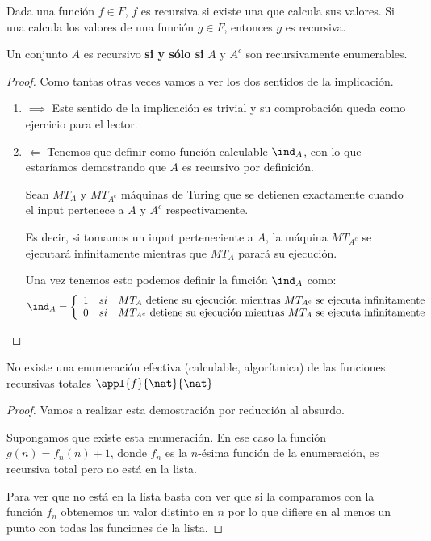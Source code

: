 \begin{theorem}
Dada una función $f\in F$, $f$ es recursiva si existe una \MT que calcula sus valores. Si una \MT calcula los valores de una función $g \in F$, entonces $g$ es recursiva.
\end{theorem}

\begin{theorem}
Un conjunto $A$ es recursivo \textbf{si y sólo si} $A$ y $A^c$ son recursivamente enumerables.
\end{theorem}
\begin{proof}
Como tantas otras veces vamos a ver los dos sentidos de la implicación.
\begin{enumerate}
\item $\implies$
Este sentido de la implicación es trivial y su comprobación queda como ejercicio para el lector.

\item $\Longleftarrow$
Tenemos que definir como función calculable $\ind_A$, con lo que estaríamos demostrando que $A$ es recursivo por definición.

Sean $MT_A$ y $MT_{A^c}$ máquinas de Turing que se detienen exactamente cuando el input pertenece a $A$ y $A^c$ respectivamente.

Es decir, si tomamos un input perteneciente a $A$, la máquina $MT_{A^c}$ se ejecutará infinitamente mientras que $MT_{A}$ parará su ejecución.

Una vez tenemos esto podemos definir la función $\ind_A$ como:
\[\ind_A = \left\{ \begin{array}{lll}
1 & si & MT_A \text{ detiene su ejecución mientras } MT_{A^c} \text{ se ejecuta infinitamente}\\
0 & si & MT_{A^c} \text{ detiene su ejecución mientras } MT_{A} \text{ se ejecuta infinitamente}
\end{array}\right.\]
\end{enumerate}
\end{proof}

\begin{theorem}
No existe una enumeración efectiva (calculable, algorítmica) de las funciones recursivas totales $\appl{f}{\nat}{\nat}$
\end{theorem}
\begin{proof}
Vamos a realizar esta demostración por reducción al absurdo.

Supongamos que existe esta enumeración. En ese caso la función $g(n)=f_n(n)+1$, donde $f_n$ es la $n$-ésima función de la enumeración, es recursiva total pero no está en la lista.

Para ver que no está en la lista basta con ver que si la comparamos con la función $f_n$ obtenemos un valor distinto en $n$ por lo que difiere en al menos un punto con todas las funciones de la lista.
\end{proof}

